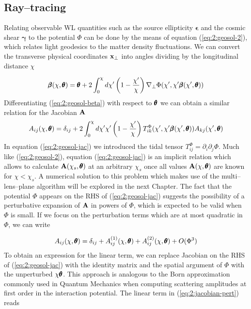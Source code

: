 \subsection{Ray--tracing}
Relating observable WL quantities such as the source ellipticity $\pmb{\epsilon}$ and the cosmic shear $\pmb{\gamma}$ to the potential $\Phi$ can be done by the means of equation (\ref{eq:2:geosol-2}), which relates light geodesics to the matter density fluctuations. We can convert the transverse physical coordinates $\mathbf{x}_\perp$ into angles dividing by the longitudinal distance $\chi$

\begin{equation}
\label{eq:2:geosol-beta}
\pmb{\beta}(\chi,\pmb{\theta}) = \pmb{\theta} + 2\int_0^\chi d\chi'\left(1-\frac{\chi'}{\chi}\right)\nabla_\perp\Phi(\chi',\chi'\pmb{\beta}(\chi',\pmb{\theta}))
\end{equation}
%
Differentiating (\ref{eq:2:geosol-beta}) with respect to $\pmb{\theta}$ we can obtain a similar relation for the Jacobian $\mathbf{A}$
\begin{equation}
\label{eq:2:geosol-jac}
A_{ij}(\chi,\pmb{\theta}) = \delta_{ij} + 2\int_0^\chi d\chi'\chi'\left(1-\frac{\chi'}{\chi}\right)T^{\Phi}_{ik}(\chi',\chi'\pmb{\beta}(\chi',\pmb{\theta}))A_{kj}(\chi',\pmb{\theta})
\end{equation}
%
In equation (\ref{eq:2:geosol-jac}) we introduced the tidal tensor $T^{\Phi}_{ij}=\partial_i\partial_j\Phi$. Much like (\ref{eq:2:geosol-2}), equation (\ref{eq:2:geosol-jac}) is an implicit relation which allows to calculate $\mathbf{A}(\chi_s,\pmb{\theta})$ at an arbitrary $\chi_s$ once all values $\mathbf{A}(\chi,\pmb{\theta})$ are known for $\chi<\chi_s$. A numerical solution to this problem which makes use of the multi--lens--plane algorithm \citep{RayTracingJain,RayTracingHartlap} will be explored in the next Chapter. 
The fact that the potential $\Phi$ appears on the RHS of (\ref{eq:2:geosol-jac}) suggests the possibility of a perturbative expansion of $\mathbf{A}$ in powers of $\Phi$, which is expected to be valid when $\Phi$ is small. If we focus on the perturbation terms which are at most quadratic in $\Phi$, we can write

\begin{equation}
\label{eq:2:jacobian-pert}
A_{ij}(\chi,\pmb{\theta}) = \delta_{ij} + A_{ij}^{(1)}(\chi,\pmb{\theta}) + A_{ij}^{(2)}(\chi,\pmb{\theta}) + O(\Phi^3)
\end{equation}
%
To obtain an expression for the linear term, we can replace Jacobian on the RHS of (\ref{eq:2:geosol-jac}) with the identity matrix and the spatial argument of $\Phi$ with the unperturbed $\chi\pmb{\theta}$. This approach is analogous to the Born approximation commonly used in Quantum Mechanics when computing scattering amplitudes at first order in the interaction potential. The linear term in (\ref{eq:2:jacobian-pert}) reads

